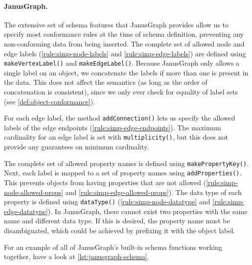 \documentclass{report}
\theoremstyle{definition}
\begin{document}
\paragraph{JanusGraph.} The extensive set of schema features that JanusGraph provides allow us to specify most conformance rules at the time of schema definition, preventing any non-conforming data from being inserted. The complete set of allowed node and edge labels (\autoref{rule:simp-node-labels} and \ref{rule:simp-edge-labels}) are defined using \texttt{makeVertexLabel()} and \texttt{makeEdgeLabel()}. Because JanusGraph only allows a single label on an object, we concatenate the labels if more than one is present in the data. This does not affect the semantics (as long as the order of concatenation is consistent), since we only ever check for equality of label sets (see \autoref{def:object-conformance}).

For each edge label, the method \texttt{addConnection()} lets us specify the allowed labels of the edge endpoints (\autoref{rule:simp-edge-endpoints}). The maximum cardinality for an edge label is set with \texttt{multiplicity()}, but this does not provide any guarantees on minimum cardinality.

The complete set of allowed property names is defined using \texttt{makePropertyKey()}. Next, each label is mapped to a set of property names using \texttt{addProperties()}. This prevents objects from having properties that are not allowed (\autoref{rule:simp-node-allowed-props} and \ref{rule:simp-edge-allowed-props}). The data type of each property is defined using \texttt{dataType()} (\autoref{rule:simp-node-datatype} and \ref{rule:simp-edge-datatype}). In JanusGraph, there cannot exist two properties with the same name and different data type. If this is desired, the property name must be disambiguated, which could be achieved by prefixing it with the object label.

For an example of all of JanusGraph's built-in schema functions working together, have a look at \autoref{lst:janusgraph-schema}.
\end{document}
